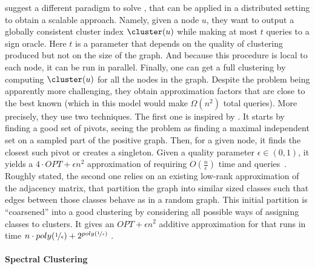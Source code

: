 \Textcite{Bonchi2013} suggest a different paradigm to solve \pcc{}, that can be applied in a
distributed setting to obtain a scalable approach. Namely, given a node $u$, they want to output a
globally consistent cluster index $\cluster(u)$ while making at most $t$ queries to a sign oracle.
Here $t$ is a parameter that depends on the quality of clustering produced but not on the size of
the graph. And because this procedure is local to each node, it can be run in parallel. Finally, one
can get a full clustering by computing $\cluster(u)$ for all the nodes in the graph. Despite the
problem being apparently more challenging, they obtain approximation factors that are close to the
best known (which in this model would make $\Omega(n^2)$ total queries). More precisely, they use
two techniques.
The first one is inspired by \ccpivot{}. It starts by finding a good set of pivots, seeing the
problem as finding a maximal independent set on a sampled part of the positive graph. Then, for a
given node, it finds the closest such pivot or creates a singleton. Given a quality parameter
$\epsilon\in(0,1)$, it yields a $4\cdot OPT + \epsilon n^2$ approximation of \mind{} requiring
$O(\frac{n}{\epsilon})$ time and queries~\autocite[Theorem 3.3]{Bonchi2013}.
Roughly stated, the second one relies on an existing low-rank approximation of the adjacency matrix,
that partition the graph into similar sized classes such that edges between those classes behave as
in a random graph. This initial partition is \enquote{coarsened} into a good clustering by
considering all possible ways of assigning classes to clusters. It gives an $OPT + \epsilon n^2$
additive approximation  for \mind{} that runs in time $n \cdot poly(\nicefrac{1}{\epsilon}) +
2^{poly(\nicefrac{1}{\epsilon})}$ \autocite[Corollary 3.7]{Bonchi2013}.

\paragraph{Spectral Clustering}

